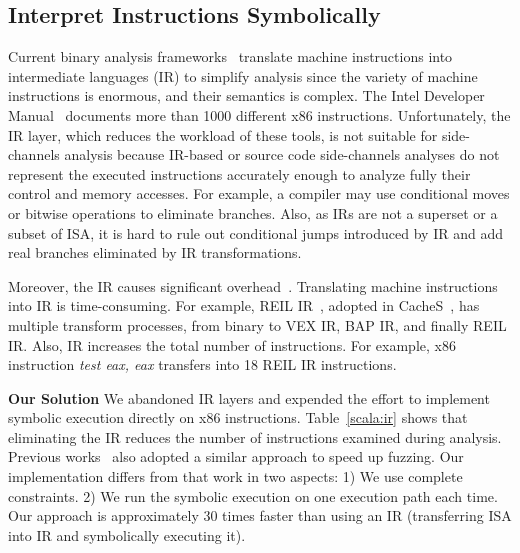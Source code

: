 \subsection{Interpret Instructions Symbolically}
Current binary analysis frameworks~\cite{shoshitaishvili2016state,
  10.1007/978-3-642-22110-1_37, song2008bitblaze} translate machine instructions into
intermediate languages (IR) to simplify analysis since
the variety of machine instructions is
enormous, and their semantics is complex. The Intel Developer
Manual~\cite{intelsys} documents more than 1000 different x86 instructions.
Unfortunately, the IR layer, which
reduces the workload of these tools, is not suitable for side-channels
analysis because
IR-based or source code side-channels analyses do not represent the executed instructions accurately enough to analyze fully their control and memory accesses.
For example, a compiler may use conditional moves or bitwise operations to eliminate
branches. Also, as IRs are not a superset or a subset of ISA,
it is hard to rule out conditional jumps introduced by IR and add real branches
eliminated by IR transformations.

Moreover, the IR causes significant overhead~\cite{217563}.
Translating machine instructions into IR is time-consuming. For example,
REIL IR~\cite{dullien2009reil}, adopted in CacheS~\cite{236338}, has multiple
transform processes, from binary to VEX IR, BAP IR, and finally REIL IR\@.
Also, IR increases the total number of instructions. For example, x86
instruction \textit{test eax, eax} transfers into 18 REIL IR instructions.

\textbf{Our Solution}
We abandoned IR layers and expended the effort to implement
symbolic execution directly on x86 instructions.
Table~\ref{scala:ir} shows that eliminating the IR reduces the number
of instructions examined during analysis. Previous works~\cite{217563} also
adopted a similar approach to speed up fuzzing. Our implementation differs
from that work in two aspects: 1) We use complete constraints. 2) We run the
symbolic execution on one execution path each time. Our approach is approximately 30 times faster than using an IR (transferring ISA into IR and
symbolically executing it).

